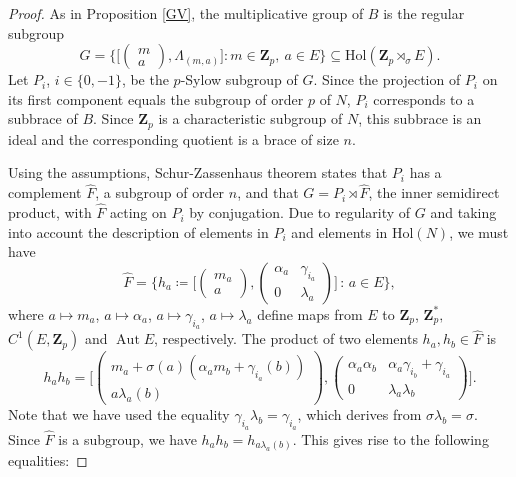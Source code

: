 \documentclass[12pt]{article}
\theoremstyle{definition}
\newcommand{\Z}{\mathbf Z}
\newcommand{\Hol}{\mathrm{Hol}}
\newcommand{\Aut}{\operatorname{Aut}}
\begin{document}
\begin{proof}
As in Proposition \ref{GV}, the multiplicative group of $B$ is the regular subgroup 
$$
G=\Big\{\Big[\begin{pmatrix}
		m\\
		a
		\end{pmatrix},\Lambda_{(m,a)}\Big]: m\in\Z_p,\ a \in E\Big\}\subseteq \Hol(\Z_p\rtimes_{\sigma} E).
        $$
Let $P_i$, $i\in\{0,-1\}$, be  the $p$-Sylow subgroup of $G$. Since the projection of $P_i$ on its first component equals the subgroup of order $p$ of $N$, $P_i$ corresponds to a subbrace of $B$. Since $\Z_p$ is a characteristic subgroup of $N$, this subbrace is an ideal and the corresponding quotient is a brace of size $n$.

Using the assumptions, Schur-Zassenhaus theorem states that $P_i$ has a complement $\hat F$, a subgroup of order $n$, and that $G=P_i\rtimes \hat F$, the inner semidirect product, with $\hat F$ acting on $P_i$ by conjugation. Due to regularity of $G$ and taking into account the description of elements in $P_i$ and elements in $\Hol(N)$, we must have
\begin{equation}\label{F}		
\hat F=\Big\{ h_a\coloneqq\Big[\begin{pmatrix}
		m_a\\
		a
		\end{pmatrix},\begin{pmatrix}
		\alpha_a & \gamma_{i_a}\\
		0&\lambda_a
		\end{pmatrix}\Big] \, : \, a \in E\Big\},
\end{equation}
where $a \mapsto m_a$, $a \mapsto \alpha_a$, $a \mapsto \gamma_{i_a}$, $a \mapsto \lambda_a$ define maps from $E$ to $\Z_p$, $\Z_p^*,$ $C^1(E,\Z_p)$ and $\Aut E$, respectively. The product of two elements  $h_a,h_b\in \hat F$ is
		$$h_ah_b=\Big[\begin{pmatrix}
		m_a+\sigma(a)(\alpha_a m_b+\gamma_{i_a}(b))\\
		a\lambda_a(b)
		\end{pmatrix}, \begin{pmatrix}
		\alpha_a\alpha_b & \alpha_a\gamma_{i_b}+\gamma_{i_a}\\
		0&\lambda_a\lambda_b
		\end{pmatrix}\Big].
		$$ Note that we have used the equality $\gamma_{i_a}\lambda_b=\gamma_{i_a}$, which derives from  $\sigma\lambda_b=\sigma$.
Since $\hat F$ is a subgroup, we have $h_ah_b=h_{a\lambda_a(b)}$. This gives rise to the following equalities:

\end{proof}
\end{document}
